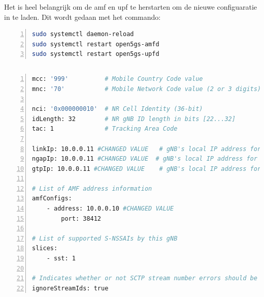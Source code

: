 Het is heel belangrijk om de \gls{amf} en \gls{upf} te herstarten om de nieuwe configuaratie in te laden. Dit wordt gedaan met het commando: 

\begin{lstlisting}[basicstyle=\small, frame=single, breaklines=true, postbreak=\mbox{\textcolor{red}{$\hookrightarrow$}\space}, escapeinside ={\%,}, escapechar={!}, numbers=left, language=sh, caption=Reload AMF en UPF]
sudo systemctl daemon-reload
sudo systemctl restart open5gs-amfd
sudo systemctl restart open5gs-upfd
\end{lstlisting}

\subsection{}%
\label{sec:gnb_config}%

\begin{lstlisting}[basicstyle=\small, frame=single, breaklines=true, postbreak=\mbox{\textcolor{red}{$\hookrightarrow$}\space}, escapeinside ={\%,}, escapechar={!}, numbers=left, language=sh, caption=gnb configuratie]
mcc: '999'          # Mobile Country Code value
mnc: '70'           # Mobile Network Code value (2 or 3 digits)

nci: '0x000000010'  # NR Cell Identity (36-bit)
idLength: 32        # NR gNB ID length in bits [22...32]
tac: 1              # Tracking Area Code

linkIp: 10.0.0.11 #CHANGED VALUE   # gNB's local IP address for Radio Link Simulation (Usually same with local IP)
ngapIp: 10.0.0.11 #CHANGED VALUE  # gNB's local IP address for N2 Interface (Usually same with local IP)
gtpIp: 10.0.0.11 #CHANGED VALUE    # gNB's local IP address for N3 Interface (Usually same with local IP)

# List of AMF address information
amfConfigs:
    - address: 10.0.0.10 #CHANGED VALUE
        port: 38412

# List of supported S-NSSAIs by this gNB
slices:
    - sst: 1

# Indicates whether or not SCTP stream number errors should be ignored.
ignoreStreamIds: true
\end{lstlisting}

\subsection{}%
\label{sec:ue_config}%

